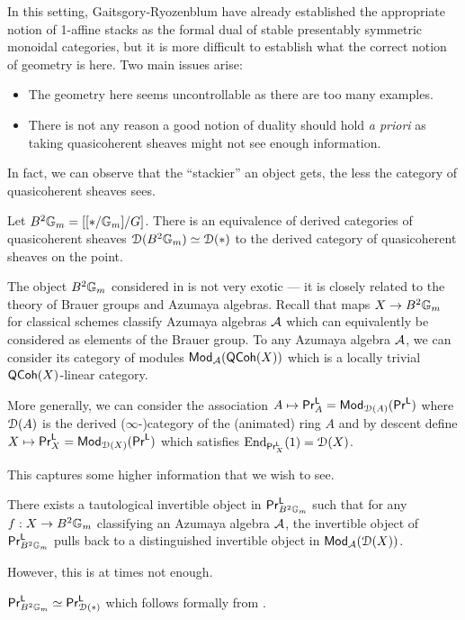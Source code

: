 In this setting, Gaitsgory-Ryozenblum have already established the appropriate notion of 1-affine stacks as the formal dual of stable presentably symmetric monoidal categories, but it is more difficult to establish what the correct notion of geometry is here. Two main issues arise: 
\begin{itemize}
    \item The geometry here seems uncontrollable as there are too many examples. 
    \item There is not any reason a good notion of duality should hold \emph{a priori} as taking quasicoherent sheaves might not see enough information. 
\end{itemize}
In fact, we can observe that the ``stackier'' an object gets, the less the category of quasicoherent sheaves sees. 
\begin{example}\label{ex: B2Gm}
    Let $B^{2}\mathbb{G}_{m}=[[*/\mathbb{G}_{m}]/G]$. There is an equivalence of derived categories of quasicoherent sheaves $\EuScript{D}(B^{2}\mathbb{G}_{m})\simeq\EuScript{D}(*)$ to the derived category of quasicoherent sheaves on the point. 
\end{example}
The object $B^{2}\mathbb{G}_{m}$ considered in \label{ex: B2Gm} is not very exotic --- it is closely related to the theory of Brauer groups and Azumaya algebras. Recall that maps $X\to B^{2}\mathbb{G}_{m}$ for classical schemes classify Azumaya algebras $\mathcal{A}$ which can equivalently be considered as elements of the Brauer group. To any Azumaya algebra $\mathcal{A}$, we can consider its category of modules $\mathsf{Mod}_{\mathcal{A}}(\mathsf{QCoh}(X))$ which is a locally trivial $\mathsf{QCoh}(X)$-linear category. 

More generally, we can consider the association $A\mapsto\mathsf{Pr}^{\mathsf{L}}_{A}=\mathsf{Mod}_{\EuScript{D}(A)}(\mathsf{Pr}^{\mathsf{L}})$ where $\EuScript{D}(A)$ is the derived ($\infty$-)category of the (animated) ring $A$ and by descent define $X\mapsto\mathsf{Pr}^{\mathsf{L}}_{X}=\mathsf{Mod}_{\EuScript{D}(X)}(\mathsf{Pr}^{\mathsf{L}})$ which satisfies $\mathrm{End}_{\mathsf{Pr}^{\mathsf{L}}_{X}}(1)=\EuScript{D}(X)$. 

This captures some higher information that we wish to see. 
\begin{example}
    There exists a tautological invertible object in $\mathsf{Pr}^{\mathsf{L}}_{B^{2}\mathbb{G}_{m}}$ such that for any $f:X\to B^{2}\mathbb{G}_{m}$ classifying an Azumaya algebra $\mathcal{A}$, the invertible object of $\mathsf{Pr}^{\mathsf{L}}_{B^{2}\mathbb{G}_{m}}$ pulls back to a distinguished invertible object in $\mathsf{Mod}_{\mathcal{A}}(\EuScript{D}(X))$. 
\end{example}
However, this is at times not enough. 
\begin{example}
    $\mathsf{Pr}^{\mathsf{L}}_{B^{2}\mathbb{G}_{m}}\simeq\mathsf{Pr}^{\mathsf{L}}_{\EuScript{D}(*)}$ which follows formally from . 
\end{example}

